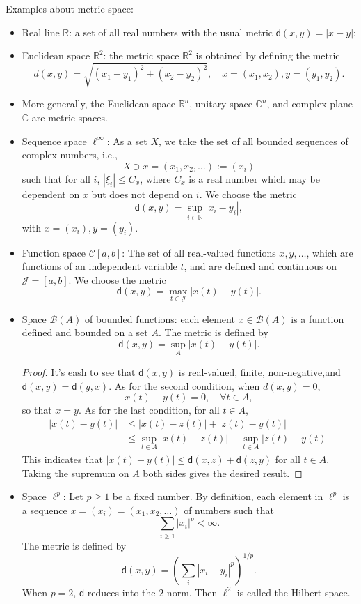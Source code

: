 \begin{example}
Examples about metric space:
\begin{itemize}
\item
Real line $\mathbb{R}$:
a set of all real numbers with the usual metric $\textsf{d}(x,y)=|x-y|$;
\item
Euclidean space $\mathbb{R}^2$:
the metric space $\mathbb{R}^2$ is obtained by defining the metric
\[
d(x,y) = \sqrt{(x_1-y_1)^2 + (x_2-y_2)^2},\quad
x=(x_1,x_2), y=(y_1,y_2).
\]
\item
More generally, the Euclidean space $\mathbb{R}^n$, unitary space $\mathbb{C}^n$, and complex plane $\mathbb{C}$ are metric spaces.
\item
Sequence space $\ell^\infty$: As a set $X$, we take the set of all bounded sequences of complex numbers, i.e.,
\[
X\ni x=(x_1,x_2, \ldots):=(x_i)
\]
such that for all $i$, $|\xi_i|\le C_x$, where $C_x$ is a real number which may be dependent on $x$ but does not depend on $i$.
We choose the metric
\[
\textsf{d}(x,y)=\sup_{i\in\mathbb{N}}|x_i-y_i|,
\]
with $x=(x_i), y=(y_i).$
\item
Function space $\mathcal{C}[a,b]$:
The set of all real-valued functions $x,y,\ldots$,
which are functions of an independent variable $t$,
and are defined and continuous on $\mathcal{J}=[a,b]$.
We choose the metric
\[
\textsf{d}(x,y) = \max_{t\in\mathcal{J}}|x(t) - y(t)|.
\]
\item
Space $\mathcal{B}(A)$ of bounded functions:
each element $x\in\mathcal{B}(A)$ is a function defined and bounded on a set $A$.
The metric is defined by 
\[
\textsf{d}(x,y)=\sup_{A}|x(t)-y(t)|.
\]
\begin{proof}
It's eash to see that $\textsf{d}(x,y)$ is real-valued, finite, non-negative,and $\textsf{d}(x,y)=\textsf{d}(y,x)$.
As for the second condition, when $d(x,y)=0$,
\[
x(t)-y(t)=0,\quad \forall t\in A,
\]
so that $x=y$.
As for the last condition, for all $t\in A$,
\begin{align*}
|x(t) - y(t)|
&\le
|x(t) - z(t)| + |z(t)-y(t)|\\
&\le
\sup_{t\in A}|x(t) - z(t)| + \sup_{t\in A}|z(t)-y(t)|
\end{align*}
This indicates that $|x(t) - y(t)|\le \textsf{d}(x,z)+\textsf{d}(z,y)$ for all $t\in A$. Taking the supremum on $A$ both sides gives the desired result.
\end{proof}
\item
Space $\ell^p$: 
Let $p\ge 1$ be a fixed number.
By definition, each element in $\ell^p$ is a sequence $x=(x_i)=(x_1,x_2,\ldots)$ of numbers such that 
\[
\sum_{i\ge1}|x_i|^p<\infty.
\]
The metric is defined by
\[
\textsf{d}(x,y)=\left(
\sum_i|x_i-y_i|^p
\right)^{1/p}.
\]
When $p=2$, $\textsf{d}$ reduces into the $2$-norm.
Then $\ell^2$ is called the Hilbert space.
\end{itemize}
\end{example}

